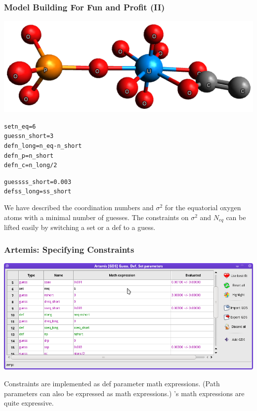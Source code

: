 \documentclass[10pt, xcolor=x11names, compress]{beamer}
\begin{document}
\begin{frame}[fragile]
  \frametitle{Model Building For Fun and Profit (II)}

  \begin{center}
    \quad\includegraphics[width=0.7\linewidth]{mfc/uranyl.png}
  \end{center}

  \begin{block}{}
    \begin{alltt}
    \scriptsize
     {\color{setp}set}      n\_eq     = 6
     {\color{guessp}guess}    n\_short  = 3
     {\color{defp}def}      n\_long   = n\_eq - n\_short
     {\color{defp}def}      n\_p      = n\_short
     {\color{defp}def}      n\_c      = n\_long / 2

     {\color{guessp}guess}    ss\_short = 0.003
     {\color{defp}def}      ss\_long  = ss\_short
    \end{alltt}
  \end{block}

  We have described the coordination numbers and $\sigma^2$ for the
  equatorial oxygen atoms with a minimal number of
  {\color{guessp}guess}es.  The constraints on $\sigma^2$ and
  $N_{eq}$ can be lifted easily by switching a {\color{setp}set} or
  a {\color{defp}def} to a {\color{guessp}guess}.
\end{frame}
  
\begin{frame}
  \frametitle{Artemis: Specifying Constraints}

  \begin{center}
    \includegraphics[width=\linewidth]{artemis/constraint.png}

    Constraints are implemented as {\color{defp}def} parameter math
    expressions.  (Path parameters can also be expressed as math
    expressions.)  {\ifeffit}'s math expressions are quite expressive.
  \end{center}
\end{frame}
\end{document}
